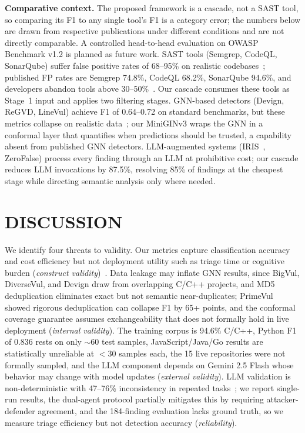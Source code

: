 \textbf{Comparative context.} The proposed framework is a cascade, not a SAST tool, so comparing its F1 to any single tool's F1 is a category error; the numbers below are drawn from respective publications under different conditions and are not directly comparable. A controlled head-to-head evaluation on OWASP Benchmark v1.2 is planned as future work. SAST tools (Semgrep, CodeQL, SonarQube) suffer false positive rates of 68--95\% on realistic codebases~\cite{ghostsecurity2025}; published FP rates are Semgrep 74.8\%, CodeQL 68.2\%, SonarQube 94.6\%, and developers abandon tools above 30--50\%~\cite{johnson2013}. Our cascade consumes these tools as Stage~1 input and applies two filtering stages. GNN-based detectors (Devign, ReGVD, LineVul) achieve F1 of 0.64--0.72 on standard benchmarks, but these metrics collapse on realistic data~\cite{primevul2024}; our MiniGINv3 wraps the GNN in a conformal layer that quantifies when predictions should be trusted, a capability absent from published GNN detectors. LLM-augmented systems (IRIS~\cite{iris2025}, ZeroFalse) process every finding through an LLM at prohibitive cost; our cascade reduces LLM invocations by 87.5\%, resolving 85\% of findings at the cheapest stage while directing semantic analysis only where needed.

\section{\uppercase{Discussion}}
\label{sec:discussion}

We identify four threats to validity. Our metrics capture classification accuracy and cost efficiency but not deployment utility such as triage time or cognitive burden (\emph{construct validity})~\cite{johnson2013}. Data leakage may inflate GNN results, since BigVul, DiverseVul, and Devign draw from overlapping C/C++ projects, and MD5 deduplication eliminates exact but not semantic near-duplicates; PrimeVul~\cite{primevul2024} showed rigorous deduplication can collapse F1 by 65+ points, and the conformal coverage guarantee assumes exchangeability that does not formally hold in live deployment (\emph{internal validity}). The training corpus is 94.6\% C/C++, Python F1 of 0.836 rests on only $\sim$60 test samples, JavaScript/Java/Go results are statistically unreliable at $<$30 samples each, the 15 live repositories were not formally sampled, and the LLM component depends on Gemini 2.5 Flash whose behavior may change with model updates (\emph{external validity}). LLM validation is non-deterministic with 47--76\% inconsistency in repeated tasks~\cite{steenhoek2024}; we report single-run results, the dual-agent protocol partially mitigates this by requiring attacker-defender agreement, and the 184-finding evaluation lacks ground truth, so we measure triage efficiency but not detection accuracy (\emph{reliability}).

